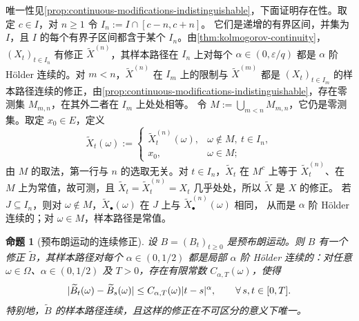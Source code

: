 \documentclass[UTF8,11pt,a4paper,oneside,fontset=fandol]{ctexrep}
\makeatletter
\numberwithin{equation}{section}
\theoremstyle{zhthm}
\newtheorem{proposition}[theorem]{命题}
\renewenvironment{proof}[1][\proofname]{\par
  \pushQED{\qed}%
  \normalfont\topsep6\p@\@plus6\p@\relax
  \trivlist
  \item[\hskip\labelsep\bfseries#1\hspace{0.5em}]\ignorespaces
}{%
  \popQED\endtrivlist\@endpefalse
}
\renewcommand{\proofname}{证明}
\DeclarePairedDelimiter{\abs}{\lvert}{\rvert}
\makeatother
\begin{document}
\begin{proof}
唯一性见\cref{prop:continuous-modifications-indistinguishable}，下面证明存在性。取定 $c\in I$，对 $n\ge1$ 令 $I_n:=I\cap[c-n,c+n]$。
它们是递增的有界区间，并集为 $I$，且 $I$ 的每个有界子区间都含于某个 $I_n$。由\cref{thm:kolmogorov-continuity}，
$(X_t)_{t\in I_n}$ 有修正 $\widetilde X^{(n)}$，其样本路径在 $I_n$ 上对每个 $\alpha\in(0,\varepsilon/q)$ 都是 $\alpha$ 阶
Hölder 连续的。对 $m<n$，$\widetilde X^{(n)}$ 在 $I_m$ 上的限制与 $\widetilde X^{(m)}$ 都是 $(X_t)_{t\in I_m}$
的样本路径连续的修正，由\cref{prop:continuous-modifications-indistinguishable}，存在零测集 $M_{m,n}$，在其外二者在 $I_m$ 上处处相等。
令 $M:=\bigcup_{m<n}M_{m,n}$，它仍是零测集。取定 $x_0\in E$，定义
\[
  \widetilde X_t(\omega):=
  \begin{cases}
    \widetilde X^{(n)}_t(\omega), & \omega\notin M,\ t\in I_n,\\
    x_0, & \omega\in M;
  \end{cases}
\]
由 $M$ 的取法，第一行与 $n$ 的选取无关。对 $t\in I_n$，$\widetilde X_t$ 在 $M^c$ 上等于 $\widetilde X^{(n)}_t$、在 $M$
上为常值，故可测，且 $\widetilde X_t=\widetilde X^{(n)}_t=X_t$ 几乎处处，所以 $\widetilde X$ 是 $X$ 的修正。
若 $J\subseteq I_n$，则对 $\omega\notin M$，$\widetilde X_\bullet(\omega)$ 在 $J$ 上与 $\widetilde X^{(n)}_\bullet(\omega)$ 相同，
从而是 $\alpha$ 阶 Hölder 连续的；对 $\omega\in M$，样本路径是常值。
\end{proof}

\begin{proposition}[预布朗运动的连续修正]
\label{prop:pre-brownian-holder-modification}
设 $B=(B_t)_{t\ge0}$ 是预布朗运动。则 $B$ 有一个修正 $\widetilde B$，其样本路径对每个 $\alpha\in(0,1/2)$
都是局部 $\alpha$ 阶 Hölder 连续的：对任意 $\omega\in\Omega$、$\alpha\in(0,1/2)$ 及 $T>0$，存在有限常数
$C_{\alpha,T}(\omega)$，使得
\[
  \abs{\widetilde B_t(\omega)-\widetilde B_s(\omega)}\le C_{\alpha,T}(\omega)\abs{t-s}^\alpha,\qquad\forall\,s,t\in[0,T].
\]
特别地，$\widetilde B$ 的样本路径连续，且这样的修正在不可区分的意义下唯一。
\end{proposition}
\end{document}
